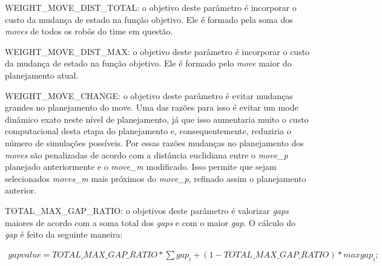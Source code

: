 WEIGHT_MOVE_DIST_TOTAL: o objetivo deste parâmetro é incorporar o custo da
mudança de estado na função objetivo. Ele é formado pela soma dos \textit{
moves} de todos os robôs do time em questão.

WEIGHT_MOVE_DIST_MAX: o objetivo deste parâmetro é incorporar o custo da
mudança de estado na função objetivo. Ele é formado pelo \textit{move}
maior do planejamento atual.

WEIGHT_MOVE_CHANGE: o objetivo deste parâmetro é evitar mudanças grandes no
planejamento do move. Uma das razões para isso é evitar um mode dinâmico
exato neste nível de planejamento, já que isso aumentaria muito o custo
computacional desta etapa do planejamento e, consequentemente, reduziria
o número de simulações possíveis. Por essas razões mudanças no planejamento
dos \textit{moves} são penalizadas de acordo com a distância euclidiana
entre o \textit{move_p} planejado anteriormente e o \textit{move_m} modificado.
Isso permite que sejam selecionados \textit{moves_m} mais próximos do
\textit{move_p}, refinado assim o planejamento anterior.


TOTAL_MAX_GAP_RATIO: o objetivos deste parâmetro é valorizar \textit{gaps} maiores
de acordo com a soma total dos \textit{gaps} e com o maior \textit{gap}.
O cálculo do \textit{gap} é feito da seguinte maneira:

\begin{eqnarray} 
 gap value = TOTAL\_MAX\_GAP\_RATIO * \sum gap_i + (1 - TOTAL\_MAX\_GAP\_RATIO) * max{gap_i};
\end{eqnarray} 
